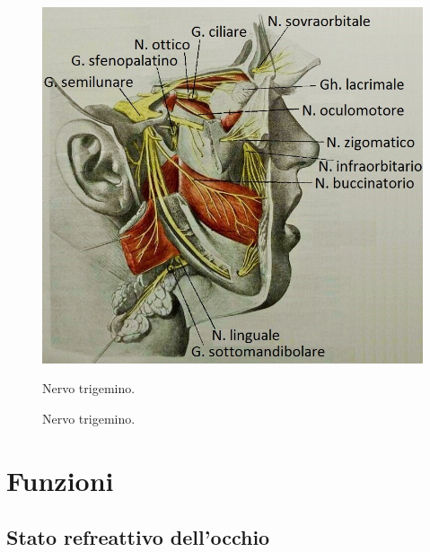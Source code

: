 \begin{figure}[h!]
	\centering
	\includegraphics[scale=0.7]{source/immagini/nervo_trigemino.jpg}
	\caption{Nervo trigemino.}{Nervo trigemino.}
	\label{fig:test11}
\end{figure}

\section{Funzioni}

\subsection{Stato refreattivo dell'occhio}

